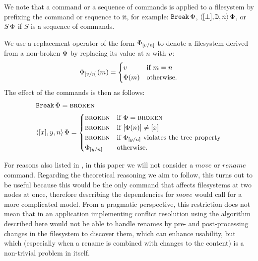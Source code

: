 We note that a command or a sequence of commands is applied to a filesystem
by prefixing the command or sequence to it, for example: $\mathtt{Break}\,\Phi$, $\langle{[\bot],\mathtt{D},n}\rangle\,\Phi$, 
or $S\,\Phi$ if $S$ is a sequence of commands.

\begin{mydef}
We use a replacement operator of the form
$\Phi_{[v/n]}$ to denote a filesystem derived from a non-broken $\Phi$ 
by replacing its value at $n$ with $v$:
\[ \Phi_{[v/n]}(m) =
   \begin{cases}
   v &\mbox{if~} m=n\\
   \Phi(m) &\mbox{otherwise.}
   \end{cases}
\]
The effect of the commands is then as follows:
\begin{align*}
&\mathtt{Break}\,\Phi = \text{\normalfont\scshape{broken}} \\
&\langle{[x],y,n}\rangle\,\Phi = 
   \begin{cases}
   \text{\normalfont\scshape{broken}} &\mbox{if~} \Phi=\text{\normalfont\scshape{broken}}\\
   \text{\normalfont\scshape{broken}} &\mbox{if~} [\Phi(n)]\neq[x]\\
   \text{\normalfont\scshape{broken}} &\mbox{if~} \Phi_{[y/n]} \mbox{~violates the tree property}\\
   \Phi_{[y/n]} &\mbox{otherwise.}
   \end{cases}
\end{align*}
\end{mydef}



\bigskip

\noindent
For reasons also listed in \cite{NREC}, in this paper we will not consider
a $move$ or $rename$ command. Regarding the theoretical reasoning we aim to follow,
this turns out to be useful because this would be the only command that affects
filesystems at two nodes at once, therefore describing 
the dependencies for $move$ would call for a more complicated model.
From a pragmatic perspective, this restriction does not mean that in an application
implementing conflict resolution using the algorithm described here would not be
able to handle renames by pre- and post-processing changes in the filesystem to
discover them, which can enhance usability, but which
(especially when a rename is combined with changes to the content)
is a non-trivial problem in itself.
